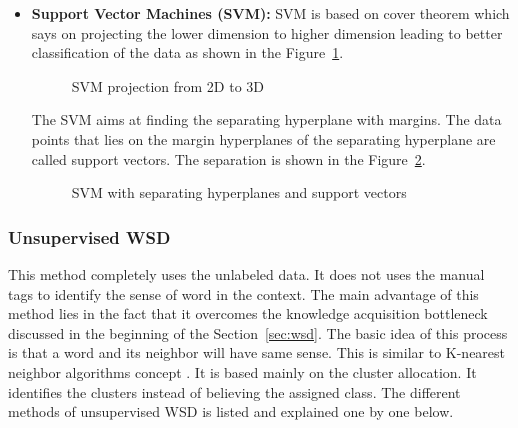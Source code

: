 \documentclass{bmcart}
\begin{document}
\begin{itemize}
\item {\bf Support Vector Machines (SVM): } SVM is based on cover theorem which says on projecting the lower dimension to higher dimension leading to better classification of the data as shown in the Figure~\ref{fig:svmProjection}.
\begin{figure}[h!tb]
\centering
{}
\caption{SVM projection from 2D to 3D}
\label{fig:svmProjection}
\end{figure}
The SVM aims at finding the separating hyperplane with margins. The data points that lies on the margin hyperplanes of the separating hyperplane are called support vectors. The separation is shown in the Figure~\ref{fig:supportVectors}.
\begin{figure}[h!tb]
\centering
{}
\caption{SVM with separating hyperplanes and support vectors}
\label{fig:supportVectors}
\end{figure}
\end{itemize}


\subsubsection{Unsupervised WSD}
\label{sssec:unsupervised}
This method completely uses the unlabeled data. It does not uses the manual tags to identify the sense of word in the context.  The main advantage of this method lies in the fact that it overcomes the knowledge acquisition bottleneck discussed in the beginning of the Section~\ref{sec:wsd}.  The basic idea of this process is that a word and its neighbor will have same sense. This is similar to K-nearest neighbor algorithms concept \cite{knn}. It is based mainly on the cluster allocation. It identifies the clusters instead of believing the assigned class. The different methods of unsupervised WSD is listed and explained one by one below.
\end{document}
